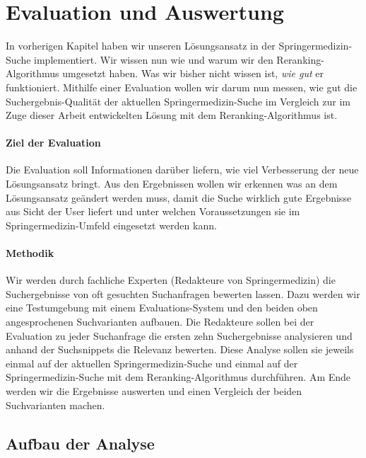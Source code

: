 %
\chapter{Evaluation und Auswertung}
\label{sec:Evaluation}

In vorherigen Kapitel haben wir unseren Lösungsansatz in der Springermedizin-Suche implementiert. Wir wissen nun wie und warum wir den Reranking-Algorithmus umgesetzt haben. Was wir bisher nicht wissen ist, \textit{wie gut} er funktioniert. Mithilfe einer Evaluation wollen wir darum nun messen, wie gut die Suchergebnis-Qualität der aktuellen Springermedizin-Suche im Vergleich zur im Zuge dieser Arbeit entwickelten Lösung mit dem Reranking-Algorithmus ist. 

\subsubsection{Ziel der Evaluation}
\label{sec:Evaluation:Einfuehrung:Ziel}

Die Evaluation soll Informationen darüber liefern, wie viel Verbesserung der neue Lösungsansatz bringt. Aus den Ergebnissen wollen wir erkennen was an dem Lösungsansatz geändert werden muss, damit die Suche wirklich gute Ergebnisse aus Sicht der User liefert und unter welchen Voraussetzungen sie im Springermedizin-Umfeld eingesetzt werden kann.

\subsubsection{Methodik}
\label{sec:Evaluation:Einfuehrung:Methodik}
Wir werden durch fachliche Experten (Redakteure von Springermedizin) die Suchergebnisse von oft gesuchten Suchanfragen bewerten lassen. Dazu werden wir eine Testumgebung mit einem Evaluations-System und den beiden oben angesprochenen Suchvarianten aufbauen. Die Redakteure sollen bei der Evaluation zu jeder Suchanfrage die ersten zehn Suchergebnisse analysieren und anhand der Suchsnippets die Relevanz bewerten. Diese Analyse sollen sie jeweils einmal auf der aktuellen Springermedizin-Suche und einmal auf der Springermedizin-Suche mit dem Reranking-Algorithmus durchführen. Am Ende werden wir die Ergebnisse auswerten und einen Vergleich der beiden Suchvarianten machen. 

\section{Aufbau der Analyse}
\label{sec:Evaluation:Aufbau}

